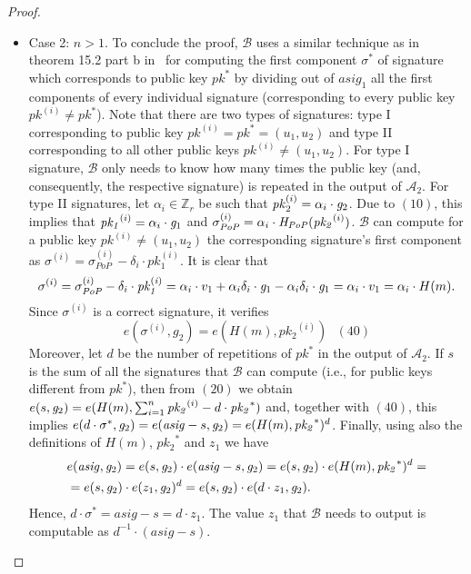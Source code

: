 \begin{proof}
\begin{itemize}
\item Case 2: $ n > 1$. To conclude the proof, $\mathcal{B}$ uses a similar technique 
as in theorem 15.2 part b in~\cite{dabo_book} for computing the first component $\sigma^*$ of signature 
which corresponds to public key $\mathit{pk}^*$ by dividing out of $\mathit{asig_1}$ all the first components of every 
individual signature (corresponding to every public key $\mathit{pk^{(i)}} \neq \mathit{pk^*}$). Note that  
there are two types of signatures: type I corresponding to public key $\mathit{pk^{(i)}} =  \mathit{pk^*} = (u_1, u_2)$ and type II
corresponding to all other public keys $\mathit{pk^{(i)}} \neq (u_1, u_2)$. For type I signature, $\mathcal{B}$
only needs to know how many times the public key (and, consequently, the respective signature) is repeated in the output of $\mathcal{A}_2$. 
For type II signatures, let $\alpha_i \in \mathbb{Z}_r$ be such that $\mathit{pk}_2^{(i)} = \alpha_i \cdot \mathit{g}_{2}$. Due to $(10)$, this implies 
that $\mathit{pk_1}^{(i)} = \alpha_i \cdot \mathit{g}_{1}$ and 
$\sigma_{\mathit{PoP}}^{(i)} = \alpha_i \cdot \mathit{H}_{\mathit{PoP}}(\mathit{pk_2}^{(i)})$. $\mathcal{B}$ can compute for a public key $\mathit{pk^{(i)}} \neq (u_1, u_2)$ 
the corresponding signature's first component as $\sigma^{(i)} = \sigma_{\mathit{PoP}}^{(i)} - \delta_i \cdot \mathit{pk_1^{(i)}}$. It is clear that 
$$\sigma^{(i)} = \sigma_{\mathit{PoP}}^{(i)} - \delta_i \cdot \mathit{pk_1^{(i)}} = \alpha_i \cdot v_1 + \alpha_i \delta_i \cdot \mathit{g}_{1} - 
\alpha_i \delta_i \cdot \mathit{g}_{1} =  \alpha_i \cdot v_1  = \alpha_i \cdot H(m).$$
\noindent Since $\sigma^{(i)}$ is a correct signature, it verifies $$e(\sigma^{(i)}, g_2) = e(H(m), \mathit{pk_2}^{(i)}) \ \ \ (40)$$ 
Moreover, let $d$ be the number of repetitions of $\mathit{pk}^{*}$ in the output of $\mathcal{A}_2$. 
If $s$ is the sum of all the signatures that $\mathcal{B}$ can compute 
(i.e., for public keys different from $\mathit{pk}^{*}$), then from $(20)$ we obtain 
$e(s,\mathit{g}_{2}) = e(H(m), \sum_{i=1}^n \mathit{pk_2}^{(i)} - d \cdot \mathit{pk_2}^{*})$ and, together with $(40)$, this implies 
$e(d \cdot \sigma^{*}, \mathit{g}_{2}) = e(\mathit{asig} - s, \mathit{g}_{2}) = e(H(m), \mathit{pk_2}^{*})^d$.
Finally, using also the definitions of $H(m)$, $\mathit{pk_2}^{\ast}$ and $z_1$ we have 
\begin{align*}
& e(\mathit{asig}, \mathit{g}_{2}) = e(s, \mathit{g}_{2}) \cdot e(\mathit{asig} - s, \mathit{g}_{2}) = e(s, \mathit{g}_{2}) \cdot e(H(m), \mathit{pk_2}^{*})^d =  \\
& = e(s, \mathit{g}_{2}) \cdot e(z_1, \mathit{g}_{2})^{d} = e(s, \mathit{g}_{2}) \cdot e(d \cdot z_1, \mathit{g}_{2}).  
\end{align*} 
\noindent Hence, $ d \cdot \sigma^{*} = \mathit{asig} - s = d \cdot z_1$. The value $z_1$ that $\mathcal{B}$ 
needs to output is computable as $d^{-1} \cdot (\mathit{asig} - s)$. 
\end{itemize}
\end{proof}